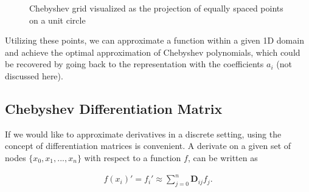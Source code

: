 \begin{figure}[ht]
  \centering


  \caption{Chebyshev grid visualized as the projection of equally spaced
    points on a unit circle}
  \label{fig:cheb_grid1d}
\end{figure}

Utilizing these points, we can approximate a function within a given 1D domain
and achieve the optimal approximation of Chebyshev polynomials, which could be
recovered by going back to the representation with the coefficients $a_i$ (not
discussed here).

\subsection{Chebyshev Differentiation Matrix}

If we would like to approximate derivatives in a discrete setting, using the
concept of differentiation matrices is convenient. A derivate on a given set of
nodes $\{x_0, x_1,..., x_n\}$ with respect to a function $f$, can be written as

\begin{align}
f(x_i)' = f_i' \approx \sum_{j=0}^{n}\mathbf{D}_{ij}f_j.
\end{align}

